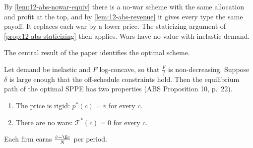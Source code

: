By \cref{lem:12-abs-nowar-equiv} there is a no-war scheme with the same allocation and profit at the top, and by
\cref{lem:12-abs-revenue} it gives every type the same payoff. It replaces each war by a lower price. The staticizing
argument of \cref{prop:12-abs-staticizing} then applies. Wars have no value with inelastic demand.

The central result of the paper identifies the optimal scheme.

\begin{proposition}\label{prop:12-abs-rigid}
Let demand be inelastic and $F$ log-concave, so that $\frac{F}{f}$ is non-decreasing. Suppose $\delta$ is large enough
that the off-schedule constraints hold. Then the equilibrium path of the optimal SPPE has two properties (ABS
Proposition 10, p.~22).
\begin{enumerate}[label=(\roman*)]
\item The price is rigid: $p^*(c) = \bar v$ for every $c$.
\item There are no wars: $\mathcal T^*(c) = 0$ for every $c$.
\end{enumerate}
Each firm earns $\frac{\bar v - \E c}{N}$ per period.
\end{proposition}

